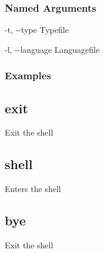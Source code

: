 \documentclass[letterpaper,10pt,english,openany,oneside]{sphinxmanual}
\begin{document}
\subsubsection{Named Arguments}
\label{\detokenize{cmd_main:Named Arguments_repeat3}}\begin{optionlist}{3cm}
\item [-t, -{-}type]  
Typefile
\item [-l, -{-}language]  
Languagefile
\end{optionlist}

\subsubsection{Examples}
\begin{sphinxVerbatim}[commandchars=\\\{\}]
   
\end{sphinxVerbatim}
\begin{sphinxVerbatim}[commandchars=\\\{\}]
   
\end{sphinxVerbatim}

\subsection{exit}
\label{\detokenize{cmd_main:exit}}
Exit the shell

\begin{sphinxVerbatim}[commandchars=\\\{\}]
  \PYG{p}{[}\PYG{p}{]}
\end{sphinxVerbatim}


\subsection{shell}
\label{\detokenize{cmd_main:shell}}
Enters the shell

\begin{sphinxVerbatim}[commandchars=\\\{\}]
  \PYG{p}{[}\PYG{p}{]}
\end{sphinxVerbatim}


\subsection{bye}
\label{\detokenize{cmd_main:bye}}
Exit the shell
\end{document}
